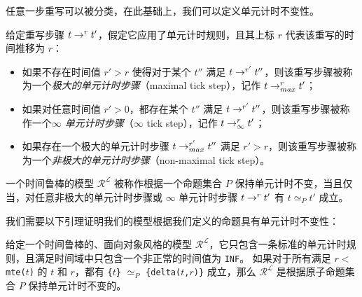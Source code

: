 任意一步重写可以被分类，在此基础上，我们可以定义单元计时不变性。
\begin{definition}
给定重写步骤 $t\mathrel{\rightarrow^{r}_{}}t'$，假定它应用了单元计时规则，且其上标 $r$ 代表该重写的时间推移为 $r$：
\begin{itemize}
\item 
如果不存在时间值 $r'>r$ 使得对于某个 $t''$ 满足 $t\mathrel{\rightarrow^{r'}_{}}t''$，则该重写步骤被称为一个\emph{极大的单元计时步骤}（maximal tick step），记作 $t\mathrel{\rightarrow^{r}_{max}}t'$；

\item 
如果对任意时间值 $r'>0$，都存在某个 $t''$ 满足 $t\mathrel{\rightarrow^{r'}_{}}t''$，则该重写步骤被称作一个\emph{$\infty$ 单元计时步骤}（$\infty$ tick step），记作 $t\mathrel{\rightarrow^{r}_{\infty}}t'$；

\item 
如果存在一个极大的单元计时步骤 $t\mathrel{\rightarrow^{r'}_{max}}t''$ 满足 $r'>r$，则该重写步骤被称为一个\emph{非极大的单元计时步骤}（non-maximal tick step）。
\end{itemize}
\end{definition}

\begin{definition}
一个时间鲁棒的模型 $\mathcal{R^L}$ 被称作根据一个命题集合 $P$ 保持单元计时不变，当且仅当，对任意非极大的单元计时步骤或 $\infty$ 单元计时步骤 $t\mathrel{\rightarrow^{r}_{}}t'$ 有 $t\simeq_P t'$ 成立。
\end{definition}

我们需要以下引理证明我们的模型根据我们定义的命题具有单元计时不变性：
\begin{lemma}
\label{l:tickinv}
给定一个时间鲁棒的、面向对象风格的模型 $\mathcal{R^L}$，它只包含一条标准的单元计时规则，且满足时间域中只包含一个非正常的时间值为 \verb|INF|。 
如果对于所有满足 $r<$ \verb|mte(|$t$\verb|)| 的 $t$ 和 $r$，都有 \verb|{|$t$\verb|}| $\simeq_P$ \verb|{delta(|$t$\verb|,|$r$\verb|)}| 成立，那么 $\mathcal{R^L}$ 是根据原子命题集合 $P$ 保持单元计时不变的。
\end{lemma}

\newcommand{\mteTask}[2]{\texttt{mteTask(}#1\texttt{,}#2\texttt{)}}
\newcommand{\deltaTask}[3]{\texttt{deltaTask(}#1\texttt{,}#2\texttt{,}#3\texttt{)}}
\newcommand{\mteIS}[1]{\texttt{mteIS(}#1\texttt{)}}
\newcommand{\deltaIS}[2]{\texttt{deltaIS(}#1\texttt{,}#2\texttt{)}}
\newcommand{\IntSrc}[3]{\texttt{<}#1\texttt{:IntSrc|val:}#2\texttt{,cycle:}#3\texttt{>}}
\newcommand{\mteIr}[1]{\texttt{mteIr(}#1\texttt{)}}
\newcommand{\mteS}[1]{\texttt{mte(}#1\texttt{)}}
\newcommand{\deltaS}[2]{\texttt{delta(}#1\texttt{,}#2\texttt{)}}
 

